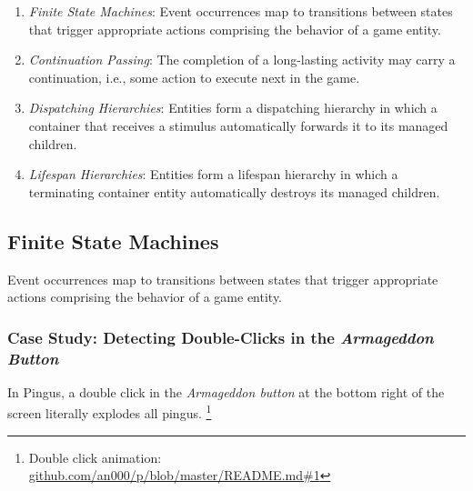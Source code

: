 \documentclass{vgtc}                          %
\begin{document}
\begin{enumerate}
\item \emph{Finite State Machines}:
    Event occurrences map to transitions between states that trigger
    appropriate actions comprising the behavior of a game entity.
\item \emph{Continuation Passing}:
    The completion of a long-lasting activity may carry a continuation, i.e.,
    some action to execute next in the game.
\item \emph{Dispatching Hierarchies}:
    Entities form a dispatching hierarchy in which a container that receives a
    stimulus automatically forwards it to its managed children.
\item \emph{Lifespan Hierarchies}:
    Entities form a lifespan hierarchy in which a terminating container entity
    automatically destroys its managed children.
\end{enumerate}

\subsection{Finite State Machines}
\label{sec.pats.fsms}

    Event occurrences map to transitions between states that trigger
    appropriate actions comprising the behavior of a game entity.

\subsubsection{Case Study: Detecting Double-Clicks in the \emph{Armageddon Button}}


In Pingus, a double click in the \emph{Armageddon button} at the bottom right
of the screen literally explodes all pingus.%
\footnote{Double click animation: \url{github.com/an000/p/blob/master/README.md#1} }
\end{document}
